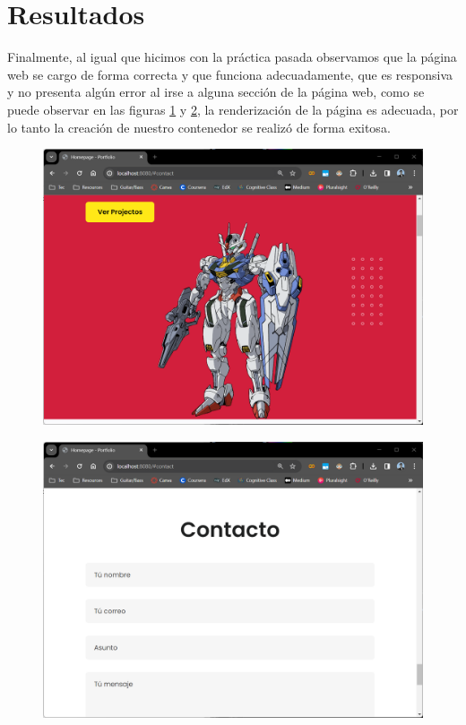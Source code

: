 \documentclass[12pt,a4paper]{article}
\begin{document}
\section{Resultados}

Finalmente, al igual que hicimos con la práctica pasada observamos que la página web se cargo de forma correcta y que funciona adecuadamente, que es responsiva y no presenta algún error al irse a alguna sección de la página web, como se puede observar en las figuras \ref{fig:Resultados_1} y \ref{fig:Resultados_2}, la renderización de la página es adecuada, por lo tanto la creación de nuestro contenedor se realizó de forma exitosa.

\begin{figure}[H]
    \centering
    \includegraphics[width=.85\linewidth]{M3_Virtualización_y_Contenedores/Tarea_3_Creación_Contenedor_Docker/reporte/figuras/7-1_Resultados.png}
    \label{fig:Resultados_1}
\end{figure}

\begin{figure}[H]
    \centering
    \includegraphics[width=.85\linewidth]{M3_Virtualización_y_Contenedores/Tarea_3_Creación_Contenedor_Docker/reporte/figuras/7-2_Resultados.png}
    \label{fig:Resultados_2}
\end{figure}
\end{document}
